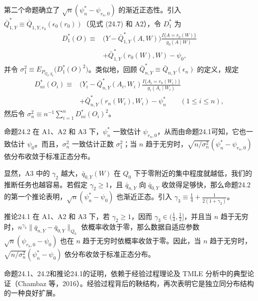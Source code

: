 第二个命题确立了 $\sqrt n(\psi_n^*-\psi_{r_n,0})$ 的渐近正态性。引入 $\bar Q_{1,Y}^*\equiv\bar Q_{1,Y,r_0}(\epsilon_0(r_0))$（见式 (24.7) 和 A2），令 $D_1^*$ 为
\begin{equation}
 \begin{aligned}
 D_1^*(O)\equiv{}&\bigl(Y-\bar Q_{1,Y}^*(A,W)\bigr)\frac{I\{A=r_0(W)\}}{g_0(A\mid W)}\\
 &+\bar Q_{1,Y}^*(r_0(W),W)-\psi_0,
 \end{aligned}
 \tag{24.9}
\end{equation}
并令 $\sigma_1^2\equiv E_{P_{Q_0,g_0}}\bigl(D_1^*(O)^2\bigr)$。类似地，回顾 $\bar Q_{n,Y}^*\equiv\bar Q_{n,Y}(\epsilon_n)$ 的定义，规定
\[
 \begin{aligned}
 D_{ni}^*(O_i)\equiv{}&\bigl(Y_i-\bar Q_{n,Y}^*(A_i,W_i)\frac{I\{A_i=r_n(W_i)\}}{g_i(A_i\mid W_i)}\\
 &+\bar Q_{n,Y}^*(r_n(W_i),W_i)-\psi_n^*
 \qquad(1\leq i\leq n),
 \end{aligned}
\]
然后令 $\sigma_n^2\equiv n^{-1}\sum_{i=1}^nD_{ni}^*(O_i)^2$。

\begin{bookresult}{命题}{24.2}
在 A1、A2 和 A3 下，$\psi_n^*$ 一致估计 $\psi_{r_n,0}$，从而由命题24.1可知，它也一致估计 $\psi_0$。而且，$\sigma_n^2$ 一致估计正数 $\sigma_1^2$；当 $n$ 趋于无穷时，$\sqrt{n/\sigma_n^2}(\psi_n^*-\psi_{r_n,0})$ 依分布收敛于标准正态分布。
\end{bookresult}

显然，A3 中的 $\gamma_2$ 越大，$\bar q_{0,Y}(W)$ 在 $Q_0$ 下于零附近的集中程度就越低，我们的推断任务也越容易。若假定 $\gamma_2\geq1$，且 $\bar q_{n,Y}$ 向 $\bar q_{0,Y}$ 收敛得足够快，那么命题24.2的第一个推论表明，$\sqrt n(\psi_n^*-\psi_0)$ 也渐近正态。引入 $\gamma_3\equiv\frac14+\frac1{2(1+\gamma_2)}$。

\begin{bookresult}{推论}{24.1}
在 A1、A2 和 A3 下，若 $\gamma_2\geq1$，因而 $\gamma_3\in(\frac14,\frac12]$，并且当 $n$ 趋于无穷时，$n^{\gamma_3}\|\bar q_{n,Y}-\bar q_{0,Y}\|_{Q_0}$ 依概率收敛于零，那么数据自适应参数 $\sqrt n(\psi_{r_n,0}-\psi_0)$ 也在 $n$ 趋于无穷时依概率收敛于零。因此，当 $n$ 趋于无穷时，$\sqrt{n/\sigma_n^2}(\psi_n^*-\psi_0)$ 依分布收敛于标准正态分布。
\end{bookresult}

命题24.1、24.2和推论24.1的证明，依赖于经验过程理论及 TMLE 分析中的典型论证（Chambaz 等，2016）。经验过程背后的鞅结构，再次表明它是独立同分布结构的一种良好扩展。

